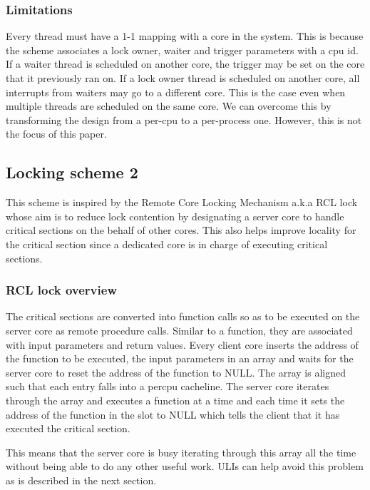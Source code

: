 \subsubsection{Limitations}

Every thread must have a 1-1 mapping with a core in the system. This is because
the scheme associates a lock owner, waiter and trigger parameters with a cpu id.
If a waiter thread is scheduled on another core, the trigger may be set on the
core that it previously ran on. If a lock owner thread is scheduled on another
core, all interrupts from waiters may go to a different core. This is the case
even when multiple threads are scheduled on the same core. We can overcome this
by transforming the design from a per-cpu to a per-process one. However, this is
not the focus of this paper.

\subsection{Locking scheme 2}

This scheme is inspired by the Remote Core Locking Mechanism a.k.a RCL lock
whose aim is to reduce lock contention by designating a server core to handle
critical sections on the behalf of other cores. This also helps improve locality
for the critical section since a dedicated core is in charge of executing
critical sections. 

\subsubsection{RCL lock overview}

The critical sections are converted into function calls so as to be executed on
the server core as remote procedure calls. Similar to a function, they are
associated with input parameters and return values. Every client core inserts
the address of the function to be executed, the input parameters in an array and
waits for the server core to reset the address of the function to NULL. The
array is aligned such that each entry falls into a percpu cacheline. The server
core iterates through the array and executes a function at a time and each time
it sets the address of the function in the slot to NULL which tells the client
that it has executed the critical section.

This means that the server core is busy iterating through this array all the
time without being able to do any other useful work. ULIs can help avoid this
problem as is described in the next section.

